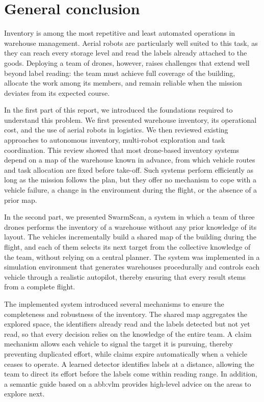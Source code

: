 \chapter*{General conclusion}
\label{chap.general-conclusion}

Inventory is among the most repetitive and least automated operations in
warehouse management. Aerial robots are particularly well suited to this task, as
they can reach every storage level and read the labels already attached to the
goods. Deploying a team of drones, however, raises challenges that extend well
beyond label reading: the team must achieve full coverage of the building,
allocate the work among its members, and remain reliable when the mission
deviates from its expected course.

In the first part of this report, we introduced the foundations required to
understand this problem. We first presented warehouse inventory, its operational
cost, and the use of aerial robots in logistics. We then reviewed existing
approaches to autonomous inventory, multi-robot exploration and task
coordination. This review showed that most drone-based inventory systems depend
on a map of the warehouse known in advance, from which vehicle routes and task
allocation are fixed before take-off. Such systems perform efficiently as long as
the mission follows the plan, but they offer no mechanism to cope with a vehicle
failure, a change in the environment during the flight, or the absence of a prior
map.

In the second part, we presented SwarmScan, a system in which a team of three
drones performs the inventory of a warehouse without any prior knowledge of its
layout. The vehicles incrementally build a shared map of the building during the
flight, and each of them selects its next target from the collective knowledge of
the team, without relying on a central planner. The system was implemented in a
simulation environment that generates warehouses procedurally and controls each
vehicle through a realistic autopilot, thereby ensuring that every result stems
from a complete flight.

The implemented system introduced several mechanisms to ensure the completeness
and robustness of the inventory. The shared map aggregates the explored space,
the identifiers already read and the labels detected but not yet read, so that
every decision relies on the knowledge of the entire team. A claim mechanism
allows each vehicle to signal the target it is pursuing, thereby preventing
duplicated effort, while claims expire automatically when a vehicle ceases to
operate. A learned detector identifies labels at a distance, allowing the team to
direct its effort before the labels come within reading range. In addition, a
semantic guide based on a \gls{abb:vlm} provides high-level advice on the areas
to explore next.

